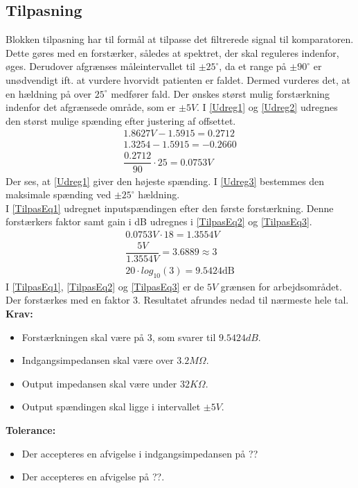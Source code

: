 \subsection{Tilpasning}\label{Tilpasningsblok}
Blokken tilpasning har til formål at tilpasse det filtrerede signal til komparatoren. Dette gøres med en forstærker, således at spektret, der skal reguleres indenfor, øges. Derudover afgrænses måleintervallet til $\pm25^{\circ}$, da et range på $\pm90^{\circ}$ er unødvendigt ift. at vurdere hvorvidt patienten er faldet. Dermed vurderes det, at en hældning på over $25^{\circ}$ medfører fald. Der ønskes størst mulig forstærkning indenfor det afgrænsede område, som er $\pm5V$. I \eqref{Udreg1} og \eqref{Udreg2} udregnes den størst mulige spænding efter justering af offsettet. 
\begin{align}
\label{Udreg1} 1.8627V - 1.5915 = 0.2712 \\
\label{Udreg2} 1.3254 - 1.5915 = -0.2660 \\
\label{Udreg3} \dfrac{0.2712}{90} \cdot 25 = 0.0753V
\end{align}
Der ses, at \eqref{Udreg1} giver den højeste spænding. I \eqref{Udreg3} bestemmes den maksimale spænding ved $\pm25^{\circ}$ hældning. \\
I \eqref{TilpasEq1} udregnet inputspændingen efter den første forstærkning. Denne forstærkers faktor samt gain i dB udregnes i \eqref{TilpasEq2} og \eqref{TilpasEq3}.
\begin{align}
\label{TilpasEq1} 0.0753V \cdot 18 = 1.3554V \\
\label{TilpasEq2} \dfrac{5V}{1.3554V} = 3.6889 \approx 3 \\
\label{TilpasEq3} 20 \cdot log_{10} (3) = 9.5424\text{dB}
\end{align} 
I \eqref{TilpasEq1}, \eqref{TilpasEq2} og \eqref{TilpasEq3} er de $5V$ grænsen for arbejdsområdet. Der forstærkes med en faktor 3. Resultatet afrundes nedad til nærmeste hele tal. \\

\noindent\textbf{Krav:}
\begin{itemize}
	\item Forstærkningen skal være på 3, som svarer til $9.5424dB$.
	\item Indgangsimpedansen skal være over $3.2M\Omega$.
	\item Output impedansen skal være under $32K\Omega$.
	\item Output spændingen skal ligge i intervallet $\pm5V$.
\end{itemize}
\noindent\textbf{Tolerance:}
\begin{itemize}
	\item Der accepteres en afvigelse i indgangsimpedansen på ??
	\item Der accepteres en afvigelse på ??.
\end{itemize}
